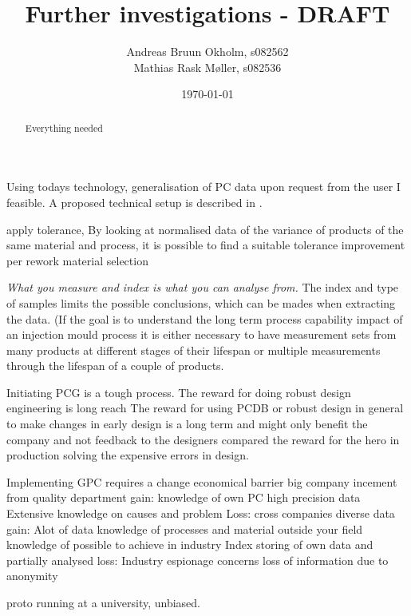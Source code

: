 \documentclass[aip,amsmath, reprint, author-year,nobalancelastpage]{revtex4-1}
\begin{document}
\begin{abstract}
Everything needed 
\end{abstract}

\title{Further investigations - DRAFT}
\author{Andreas Bruun Okholm, s082562\\
Mathias Rask Møller, s082536 }
 
\date{\today}
\maketitle


Using todays technology, generalisation of PC data upon request from the user I feasible. A proposed technical setup is described in \cite{OkholmRask******* Techpaper}.

apply tolerance, By looking at normalised data of the variance of products of the same material and process, it is possible to find a suitable tolerance
improvement per rework
material selection

\emph{What you measure and index is what you can analyse from.}
The index and type of samples limits the possible conclusions, which can be mades when extracting the data.  (If the goal is to understand the long term process capability impact of an injection mould process it is either necessary to have measurement sets from many products at different stages of their lifespan or multiple measurements through the lifespan of a couple of products.   

Initiating PCG is a tough process. 
The reward for doing robust design engineering is long reach
The reward for using PCDB or robust design in general to make changes in early design is a long term and might only benefit the company and not feedback to the designers compared the reward for the hero in production solving the expensive errors in design.

Implementing GPC requires a change
	economical barrier
		big company
			incement from quality department
			gain: 	knowledge of own PC
					high precision data
					Extensive knowledge on causes and problem
			Loss:
		cross companies
			diverse data
			gain:		Alot of data
					knowledge of processes and material outside your field
					knowledge of possible to achieve in industry
					Index storing of own data and partially analysed
			loss:		Industry espionage concerns
					loss of information due to anonymity

proto running at a university, unbiased.
\end{document}
